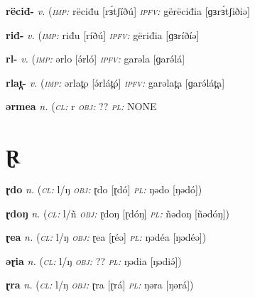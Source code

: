 \newentry
\headword\textbf{rëciđ-}  
\ipa{[rɜ́tʃið-]}
\synpos\textit{v.} 
\imperative(\textit {\textsc{imp:}} rëciđu [rɜ́tʃíðú]
\imperfective\textit{\textsc{ipfv:}} gërëciđia [ɡɜrɜ́tʃiðiə]

\newentry
\headword\textbf{riđ-}  
\ipa{[ríð-]}
\synpos\textit{v.} 
\imperative(\textit {\textsc{imp:}} riđu [ríðú]
\imperfective\textit{\textsc{ipfv:}} gëriđia [ɡɜríðíə]

\newentry
\headword\textbf{rl-}  
\ipa{[rl-]}
\synpos\textit{v.} 
\imperative(\textit {\textsc{imp:}} ərlo [ə́rló]
\imperfective\textit{\textsc{ipfv:}} garəla [ɡarə́lá]

\newentry
\headword\textbf{rlat̪-}  
\ipa{[rlát̪-]}
\synpos\textit{v.} 
\imperative(\textit {\textsc{imp:}} ərlat̪o [ə́rlát̪ó]
\imperfective\textit{\textsc{ipfv:}} garəlat̪a [ɡarə́lát̪a]

\newentry
\headword\textbf{ərmea}  
\ipa{[ərmeə]}
\synpos\textit{n.} 
\class(\textit{\textsc{cl:}} {r}
\object\textit{\textsc{obj:}} ??
\plural\textit{\textsc{pl:}} NONE


\section*{Ɽ}\label{Ɽ}

\newentry
\headword\textbf{ɽdo}  
\ipa{[ɽdó]}
\synpos\textit{n.} 
\class(\textit{\textsc{cl:}} {l/ŋ}
\object\textit{\textsc{obj:}} ɽdo [ɽdó]
\plural\textit{\textsc{pl:}} ŋədo [ŋədó]) 

\newentry
\headword\textbf{ɽdoŋ}  
\ipa{[ɽdóŋ]}
\synpos\textit{n.} 
\class(\textit{\textsc{cl:}} {l/ñ}
\object\textit{\textsc{obj:}} ɽdoŋ [ɽdóŋ]
\plural\textit{\textsc{pl:}} ñədoŋ [ñədóŋ]) 

\newentry
\headword\textbf{ɽea}  
\ipa{[ɽéə]}
\synpos\textit{n.} 
\class(\textit{\textsc{cl:}} {l/ŋ}
\object\textit{\textsc{obj:}} ɽea [ɽéə]
\plural\textit{\textsc{pl:}} ŋədéa [ŋədéə]) 

\newentry
\headword\textbf{əɽia}  
\ipa{[əɽiə́]}
\synpos\textit{n.} 
\class(\textit{\textsc{cl:}} {l/ŋ}
\object\textit{\textsc{obj:}} ??
\plural\textit{\textsc{pl:}} ŋədia [ŋədiə́]) 

\newentry
\headword\textbf{ɽra}  
\ipa{[ɽrá]}
\synpos\textit{n.} 
\class(\textit{\textsc{cl:}} {l/ŋ}
\object\textit{\textsc{obj:}} ɽra [ɽrá]
\plural\textit{\textsc{pl:}} ŋəra [ŋərá]) 

